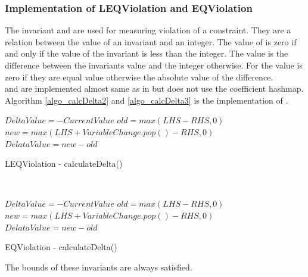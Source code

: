 \subsubsection{Implementation of LEQViolation and EQViolation}
The invariant  and  are used for measuring violation of a constraint. They are
a relation between the value of an invariant and an integer. The value of  is zero if and only if 
the value of the invariant is less than the integer. The value is the difference between the invariants value and the 
integer otherwise. For  the value is zero if they are equal value otherwise the absolute value of 
the difference. \\ 
 and  are implemented almost same as in  but 
 does not use the coefficient hashmap. \\ 
Algorithm \ref{algo_calcDelta2} and \ref{algo_calcDelta3} is the implementation of . \\ 
\IncMargin{1em}
\begin{algorithm}[H]

  \algdata
{}
\BlankLine
     {
    $DeltaValue = -CurrentValue $\;
    }{
      \int $old = max(LHS-RHS,0) $\;
      \int $new = max(LHS+VariableChange.pop() - RHS,0) $\;
      $DelataValue = new-old $\;
    }
    \Return \true \;
\caption{LEQViolation - calculateDelta()} \label{algo_calcDelta2} 
\end{algorithm} \noindent
\DecMargin{1em} \\

\IncMargin{1em}
\begin{algorithm}[H]

  \algdata
{}
\BlankLine
     {
    $DeltaValue = -CurrentValue $\;
    }{
      \int $old = max(LHS-RHS,0) $\;
      \int $new = max(LHS+VariableChange.pop() - RHS,0) $\;
      $DelataValue = new-old $\;
    }
    \Return \true \;
\caption{EQViolation - calculateDelta()} \label{algo_calcDelta3} 
\end{algorithm} \noindent
\DecMargin{1em} 
The bounds of these invariants are always satisfied. 

